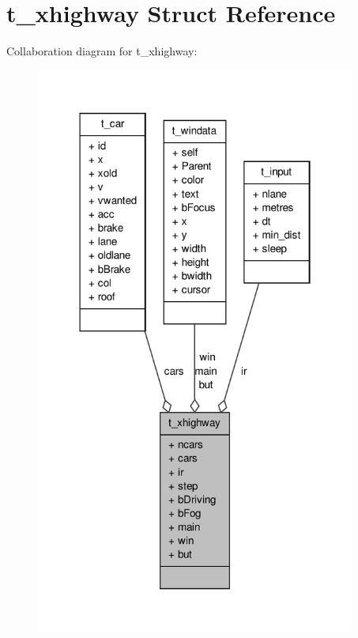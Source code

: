\hypertarget{structt__xhighway}{\section{t\-\_\-xhighway \-Struct \-Reference}
\label{structt__xhighway}
}


\-Collaboration diagram for t\-\_\-xhighway\-:
\nopagebreak
\begin{figure}[H]
\begin{center}
\leavevmode
\includegraphics[width=298pt]{structt__xhighway__coll__graph}
\end{center}
\end{figure}
